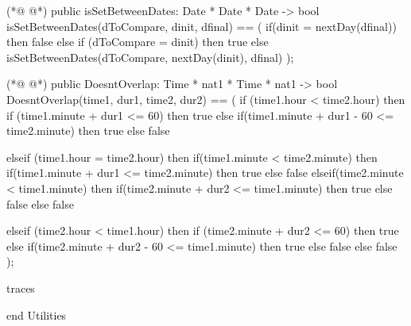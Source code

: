 \begin{vdmpp}[breaklines=true]
  
(*@
\label{isSetBetweenDates:80}
@*)
 public isSetBetweenDates: Date * Date * Date -> bool
  isSetBetweenDates(dToCompare, dinit, dfinal) == (
   if(dinit = nextDay(dfinal))
   then false
   else if (dToCompare = dinit)
   then true
   else isSetBetweenDates(dToCompare, nextDay(dinit), dfinal)
  );
   
   
(*@
\label{DoesntOverlap:90}
@*)
 public DoesntOverlap: Time * nat1 * Time * nat1 -> bool
  DoesntOverlap(time1, dur1, time2, dur2) == (
   if (time1.hour < time2.hour)
   then if (time1.minute + dur1 <= 60)
     then true
     else if(time1.minute + dur1 - 60 <= time2.minute)
        then true
        else false
 
   elseif  (time1.hour = time2.hour)
   then if(time1.minute < time2.minute)
      then if(time1.minute + dur1 <= time2.minute)
         then true
         else false
      elseif(time2.minute < time1.minute)
      then if(time2.minute + dur2 <= time1.minute)
         then true
         else false
       else false
       
   elseif (time2.hour < time1.hour)
   then if (time2.minute + dur2 <= 60)
     then true
     else if(time2.minute + dur2 - 60 <= time1.minute)
        then true
        else false
   else false
  );
  
traces

end Utilities
\end{vdmpp}
